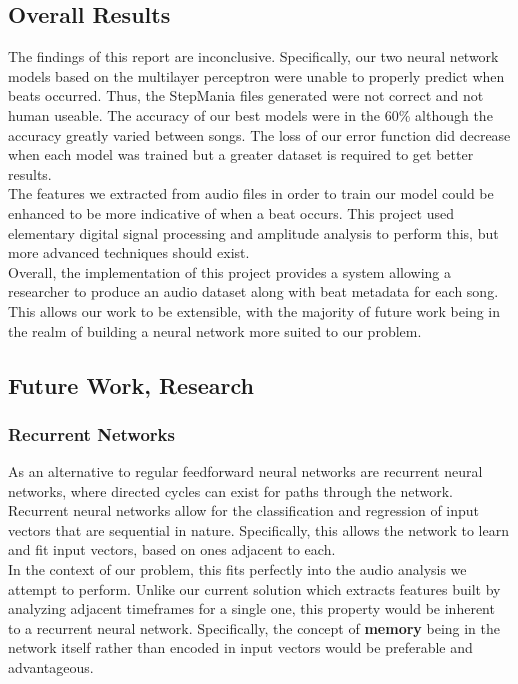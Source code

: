 \subsection{Overall Results}

The findings of this report are inconclusive. Specifically, our two neural network models based on the multilayer perceptron were unable to properly predict
when beats occurred. Thus, the StepMania files generated were not correct and not human useable. The accuracy of our best models were in the 60\% although the accuracy greatly varied between songs. The loss of our error function did decrease when each model was trained but a greater dataset is required to get better results.\\

The features we extracted from audio files in order to train our model could be enhanced to be more indicative of when a beat occurs. This project used elementary digital signal processing and amplitude analysis to perform this, but more advanced techniques should exist. \\

Overall, the implementation of this project provides a system allowing a researcher to produce an audio dataset along with beat metadata for each song. This allows our work to be extensible, with the majority of future work being in the realm of building a neural network more suited to our problem. 

\subsection{Future Work, Research}

\subsubsection{Recurrent Networks}

As an alternative to regular feedforward neural networks are recurrent neural networks, where directed cycles can exist for paths through the network. Recurrent neural networks allow for the classification and regression of input vectors that are sequential in nature. Specifically, this allows the network to learn and fit input vectors, based on ones adjacent to each.\\

In the context of our problem, this fits perfectly into the audio analysis we attempt to perform. Unlike our current solution which extracts features built by analyzing adjacent timeframes for a single one, this property would be inherent to a recurrent neural network. Specifically, the concept of \textbf{memory} being in the network itself rather than encoded in input vectors would be preferable and advantageous.


